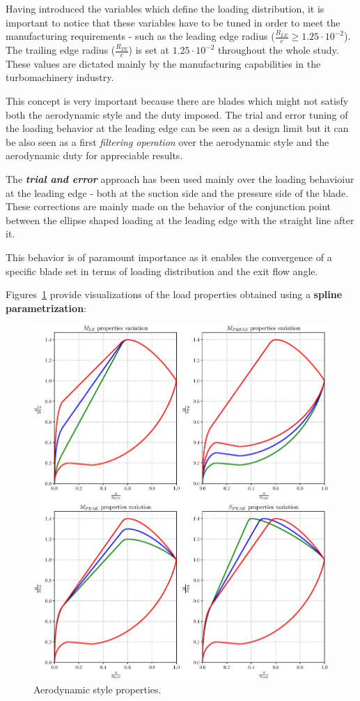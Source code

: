 Having introduced the variables which define the loading distribution, it is important to notice that these variables have to 
be tuned in order to meet the manufacturing requirements - such as the leading edge radius ($\frac{R_{LE}}{c} \geq 1.25 \cdot 10^{-2}$).
The trailing edge radius ($\frac{R_{TE}}{c}$) is set at $1.25 \cdot 10^{-2}$ throughout the whole study. These values are dictated mainly by the manufacturing capabilities in the turbomachinery industry. 

This concept is very important because there are blades which might not satisfy both the aerodynamic style and the duty imposed.
The trial and error tuning of the loading behavior at the leading edge can be seen as a design limit but it can be also seen as a first \textit{filtering operation} 
over the aerodynamic style and the aerodynamic duty for appreciable results.

The \textbf{\textit{trial and error}} approach has been used mainly over the loading behavioiur at the leading edge 
- both at the suction side and the pressure side of the blade. These corrections are mainly made on the behavior of the 
conjunction point between the ellipse shaped loading at the leading edge with the straight line after it. 

This behavior is of paramount importance as it enables the convergence of a specific blade
set in terms of loading distribution and the exit flow angle.

Figures~\ref{fig:aerodynamicStyle} provide visualizations of the load properties obtained using a \textbf{spline parametrization}:

\begin{figure}[H]
  \centering
  \includegraphics[scale=0.5]{pyFigure/figures/loadProperties.eps}
  \caption{Aerodynamic style properties.}
  \label{fig:aerodynamicStyle}
\end{figure}
